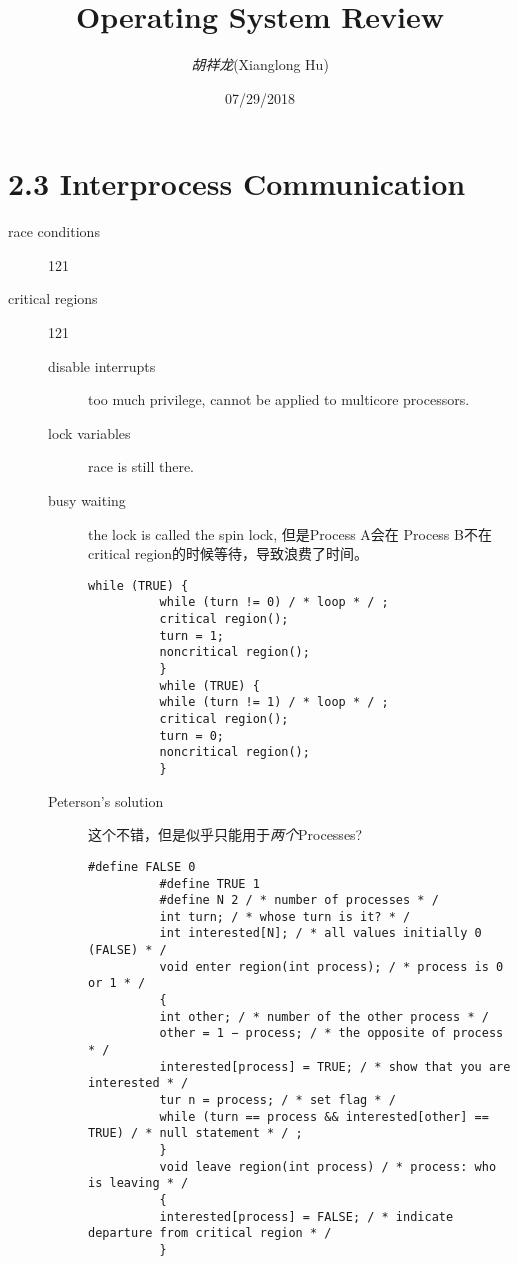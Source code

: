 \documentclass[a4paper]{article}
\title{Operating System Review}
\author{\textit{胡祥龙}(Xianglong Hu)}
\date{07/29/2018}
\begin{document}
\maketitle
\tableofcontents
\newpage

\section{2.3 Interprocess Communication}
\begin{description}
\item[race conditions]{121} 
\item[critical regions]{121}
  \begin{description}
  \item[disable interrupts] {too much privilege, cannot be applied to multicore processors.} 
  \item[lock variables] {race is still there.} 
  \item[busy waiting] {the lock is called the spin lock, 但是Process A会在
      Process B不在critical region的时候等待，导致浪费了时间。
      \begin{lstlisting}[style=CStyle]
          while (TRUE) { 
          while (turn != 0) / * loop * / ;
          critical region();
          turn = 1; 
          noncritical region();
          }
          while (TRUE) { 
          while (turn != 1) / * loop * / ;
          critical region();
          turn = 0; 
          noncritical region();
          }
      \end{lstlisting}
    } 
  \item[Peterson's solution] {这个不错，但是似乎只能用于\textit{两个}Processes?
      \begin{lstlisting}[style=CStyle]
          #define FALSE 0
          #define TRUE 1
          #define N 2 / * number of processes * /
          int turn; / * whose turn is it? * /
          int interested[N]; / * all values initially 0 (FALSE) * /
          void enter region(int process); / * process is 0 or 1 * /
          {
          int other; / * number of the other process * /
          other = 1 − process; / * the opposite of process * /
          interested[process] = TRUE; / * show that you are interested * /
          tur n = process; / * set flag * /
          while (turn == process && interested[other] == TRUE) / * null statement * / ;
          }
          void leave region(int process) / * process: who is leaving * /
          {
          interested[process] = FALSE; / * indicate departure from critical region * /
          }
        \end{lstlisting}
    } 
  \end{description}
\end{description}

\nocite{*}
% 
\end{document}
